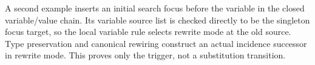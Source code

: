 A second example inserts an initial search focus before the variable in the
closed variable/value chain. Its variable source list is checked directly to
be the singleton focus target, so the local variable rule selects rewrite
mode at the old source. Type preservation and canonical rewiring construct
an actual incidence successor in rewrite mode. This proves only the trigger,
not a substitution transition.
